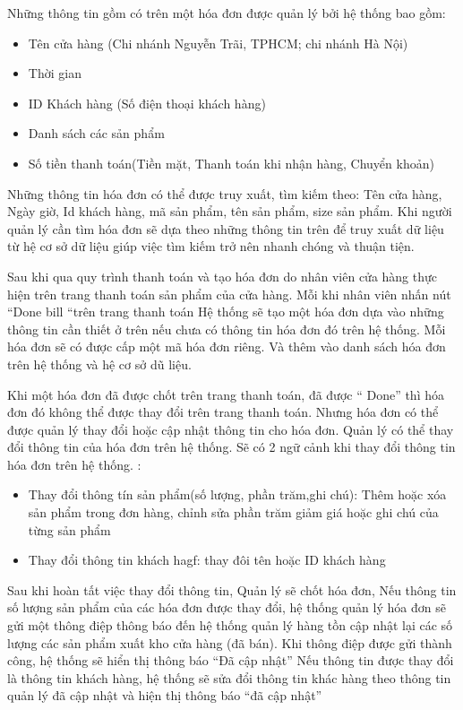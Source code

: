 \documentclass{article}
\begin{document}
Những thông tin gồm có trên một hóa đơn được quản lý bởi hệ thống bao gồm:
    \begin{itemize}
        \item Tên cửa hàng (Chi nhánh Nguyễn Trãi, TPHCM; chi nhánh Hà Nội)
        \item Thời gian
        \item ID Khách hàng (Số điện thoại khách hàng)
        \item Danh sách các sản phẩm
        \item Số tiền thanh toán(Tiền mặt, Thanh toán khi nhận hàng, Chuyển khoản)
    \end{itemize}
Những thông tin hóa đơn có thể được truy xuất, tìm kiếm theo: Tên cửa hàng, Ngày giờ, Id khách hàng, mã sản phẩm, tên sản phẩm, size sản phẩm. Khi người quản lý cần tìm hóa đơn sẽ dựa theo những thông tin trên để truy xuất dữ liệu từ hệ cơ sở dữ liệu giúp việc tìm kiếm trở nên nhanh chóng và thuận tiện. 

Sau khi qua quy trình thanh toán và tạo hóa đơn do nhân viên cửa hàng thực hiện trên trang thanh toán sản phẩm của cửa hàng. 
Mỗi khi nhân viên nhấn nút  “Done bill  “trên trang thanh toán Hệ thống sẽ tạo một hóa đơn dựa vào những thông tin cần thiết ở trên nếu chưa có thông tin hóa đơn đó trên hệ thống. Mỗi hóa đơn sẽ có được cấp một mã hóa đơn riêng. Và thêm vào danh sách hóa đơn trên hệ thống và hệ cơ sở dũ liệu. 

Khi một hóa đơn đã được chốt trên trang thanh toán, đã được “ Done” thì hóa đơn đó không thể được thay đổi trên trang thanh toán. Nhưng hóa đơn có thể được quản lý thay đổi hoặc cập nhật thông tin cho hóa đơn.
Quản lý có thể thay đổi thông tin của hóa đơn trên hệ thống. Sẽ có 2 ngữ cảnh khi thay đổi thông tin hóa đơn trên hệ thống. :
    \begin{itemize}
         \item Thay đổi thông tín sản phẩm(số lượng, phần trăm,ghi chú): Thêm hoặc xóa sản phẩm trong đơn hàng, chỉnh sửa phần trăm giảm giá hoặc ghi chú của từng sản phẩm
         \item Thay đổi thông tin khách hagf: thay đôi tên hoặc ID khách hàng
    \end{itemize}
Sau khi hoàn tất việc thay đổi thông tin, Quản lý sẽ chốt hóa đơn, Nếu thông tin số lượng sản phẩm của các hóa đơn được thay đổi, hệ thống quản lý hóa đơn sẽ gửi một thông điệp thông báo đến hệ thống quản lý hàng tồn cập nhật lại các số lượng các sản phẩm xuất kho cửa hàng (đã bán). Khi thông điệp được gửi thành công, hệ thống sẽ hiển thị thông báo “Đã cập nhật” 
Nếu thông tin được thay đổi là thông tin khách hàng, hệ thống sẽ sửa đổi thông tin khác hàng theo thông tin quản lý đã cập nhật và hiện thị thông báo “đã cập nhật”
\end{document}
